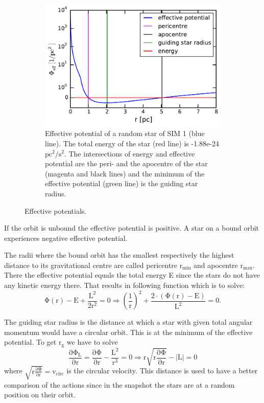 \begin{figure}[htbp]
\begin{subfigure}{0.475\textwidth}
	\end{subfigure}
	\hfill
	\begin{subfigure}{0.475\textwidth}
	\includegraphics[width=\textwidth]{Plots/pot_eff_theory_part.pdf}
	\caption{Effective potential of a random star of SIM 1 (blue line). The total energy of the star (red line) is -1.88e-24 \(\mathrm{pc}^2/\mathrm{s}^2\). The intersections of energy and effective potential are the peri- and the apocentre of the star (magenta and black lines) and the minimum of the effective potential (green line) is the guiding star radius.}
	\label{fig:pot_eff_theory_part}
	\end{subfigure}
\caption{Effective potentials.}
\label{fig:pot_eff_theory}
\end{figure}
If the orbit is unbound the effective potential is positive. A star on a bound orbit experiences negative effective potential. 
\par The radii where the bound orbit has the smallest respectively the highest distance to its gravitational centre are called pericentre \(\mathrm{r_{min}}\)  and apocentre \(\mathrm{r_{max}}\).  There the effective potential equals the total energy E since the stars do not have any kinetic energy there. That results in following function which is to solve: 
\begin{equation}\label{eq:root_pot_eff}
\mathrm {\Phi(r)-E +\frac{L^2}{2r^2}=0\Rightarrow\left(\frac{1}{r}\right)^2+\frac{2\cdot (\Phi(r)-E)}{L^2}=0.}
\end{equation}
\par The guiding star radius is the distance at which a star with given total angular momentum would have a circular orbit. This is at the minimum of the effective potential. To get \(\mathrm{r_g}\) we have to solve
\begin{equation}
\mathrm{\frac{\partial\Phi_L}{\partial r}=\frac{\partial\Phi}{\partial r}-\frac{L^2}{r^3}=0\Rightarrow r\sqrt{r\frac{\partial\Phi}{\partial r}}-|L|=0}
\end{equation} where \(\mathrm{\sqrt{r\frac{\partial\Phi}{\partial r}}=v_{circ}}\) is the circular velocity. This distance is used to have a better comparison of the actions since in the snapshot the stars are at a random position on their orbit.

